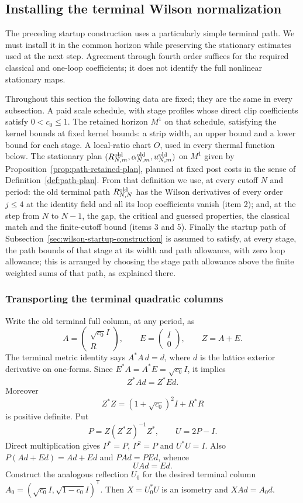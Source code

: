 \subsection{Installing the terminal Wilson normalization}
\label{sec:terminal-normalization-transfer}
The preceding startup construction uses a particularly simple terminal
path. We must install it in the common horizon while preserving the
stationary estimates used at the next step. Agreement through fourth
order suffices for the required classical and one-loop coefficients;
it does not identify the full nonlinear stationary maps.

Throughout this section the following data are fixed; they are the
same in every subsection. A paid scale schedule, with stage profiles
whose direct clip coefficients satisfy $0<c_0\le1$. The retained
horizon $M^1$ on that schedule, satisfying the kernel bounds at fixed
kernel bounds: a strip width, an upper bound and a lower bound for
each stage. A local-ratio chart $O$, used in every thermal function
below. The stationary plan
$(R^{\rm old}_{N,m},\alpha^{\rm old}_{N,m},u^{\rm old}_{N,m})$ on
$M^1$ given by Proposition~\ref{prop:path-retained-plan}, planned at
fixed post costs in the sense of Definition~\ref{def:path-plan}. From
that definition we use, at every cutoff $N$ and period: the old
terminal path $R^{\rm old}_{N,N}$ has the Wilson derivatives of every
order $j\le4$ at the identity field and all its loop coefficients
vanish (item 2); and, at the step from $N$ to $N-1$, the gap, the
critical and guessed properties, the classical match and the
finite-cutoff bound (items 3 and 5). Finally the startup path of
Subsection~\ref{sec:wilson-startup-construction} is assumed to satisfy,
at every stage, the path bounds of that stage at its width and path
allowance, with zero loop allowance; this is arranged by choosing the
stage path allowance above the finite weighted sums of that path, as
explained there.

\subsubsection{Transporting the terminal quadratic columns}
Write the old terminal full column, at any period, as
\[
 A=\begin{pmatrix}\sqrt{c_0}I\\ R\end{pmatrix},
 \qquad E=\begin{pmatrix}I\\0\end{pmatrix},\qquad Z=A+E.
\]
The terminal metric identity says $A^*A\,d=d$, where $d$ is the
lattice exterior derivative on one-forms. Since $E^*A=A^*E=
\sqrt{c_0}I$, it implies
\[
                  Z^*Ad=Z^*Ed.
\]
Moreover
\[
 Z^*Z=(1+\sqrt{c_0})^2I+R^*R
\]
is positive definite. Put
\[
 P=Z(Z^*Z)^{-1}Z^*,\qquad U=2P-I.
\]
Direct multiplication gives $P^*=P$, $P^2=P$ and $U^*U=I$.
Also $P(Ad+Ed)=Ad+Ed$ and $PAd=PEd$, whence
\[
                            UAd=Ed.
\]
Construct the analogous reflection $U_0$ for the desired terminal
column
$A_0=(\sqrt{c_0}I,\sqrt{1-c_0}I)^{\mathsf T}$.
Then $X=U_0^*U$ is an isometry and $XAd=A_0d$.

